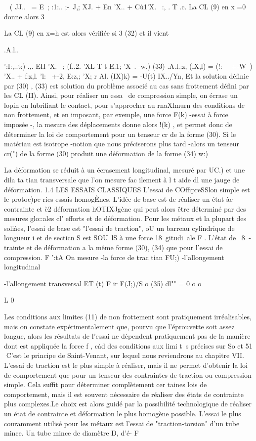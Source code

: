 ~
( JJ..~ = E~; :1:.. ;-~J,; XJ. + En 'X.. + Cù1'X.~ :, . T .c. 
La CL (9) en x =0 donne alors
3 

La CL (9) en x=h est alors vérifiée si
3
(32) et il vient 

.A.l..{':I:,..t:) .,. EH 'X.~ ;-(f..2. 'XL T t E.1; 'X~.
-w.) 
(33) .A.l.:z, (lX,l) = (!:~~ +-W~) 'X.. + f:z,l. 'l:~ +-2, E:z,; 'X; 
r Al. (IX)k) = -U(t) IX../Yn, 
Et la solution définie par (30) , (33) est solution du problème associé au cas sans frottement défini par les CL (II). Ainsi, pour réaliser un essa~ de compression simple, on écrase un lopin en lubrifiant le contact, pour s'approcher au rnaXlmurn des conditions de non frottement, et en imposant, par exemple, une force F(k) -essai à force imposée -, la mesure des dépla­cements donne alors !(k) , et permet donc de déterminer la loi de compor­tement pour un tenseur cr de la forme (30). 
Si le matériau est isotrope -notion que nous préciserons plus tard -alors un tenseur cr("\:) de la forme (30) produit une déformation de la forme 
(34) w:) 

La déformation se réduit à un écrasement longitudinal, mesuré par UC.\;) 
et une dila ta tian transversale que l'on mesure fac ilement à l t aide dl une 
jauge de déformation. 
1.4 LES ESSAIS 	CLASSIQUES 
L'essai de COffipreSSlon simple est le protoc)pe ries essais homo­gÈnes. L'idée de base est de réaliser un état àe contrainte et è2 déforma­tion hOTIXJgène qui peut alors être déterminé par des mesures glo::ales cl' ef­forts et de déformation. Pour les métaux et la plupart des soliàes, l'essai de base est "l'essai de traction", oU un barreau cylindrique de longueur i et de secticn S est SOU~lS à une force 18~gitudi~ale F . L'état de ~8~­trainte et de déformation a la même forme (30), (34) que pour l'essai de compression. 
F 
':tA On mesure -la force de trac tian FU;) -l'allongement longitudinal 


-l'allongement transversal ET (t) 
F 
ir F(J;)/S o 
(35) 
dl"" = 0 	o 
o

L 0 



Les conditions aux limites (11) de non frottement sont pratiquement irréali­sables, mais on constate expérimentalement que, pourvu que l'éprouvette soit 
assez longue, alors les résultats de l'essai ne dépendent pratiquement pas 
de la manière dont est appliquée la force f , càd des conditions aux limi­
t~s précises sur So et 51  C'est le principe de Saint-Venant, sur lequel 
nous reviendrons au chapitre VII. 
L'essai de traction est le plus simple à réaliser, mais il ne per­met d'obtenir la loi de comportement que pour un tenseur des contraintes de 
traction ou compression simple. Cela suffit pour déterminer complètement cer­
taines lois de comportement, mais il est souvent nécessaire de réaliser des états de contrainte plus complexes.Le choix est alors guidé par la possibili­té technologique de réaliser un état de contrainte et déformation le plus ho­mogène possible. L'essai le plus couramment utilisé pour les métaux est l'es­sai de "traction-torsion" d'un tube mince. Un tube mince de diamètre D, d'é-
F 

}
